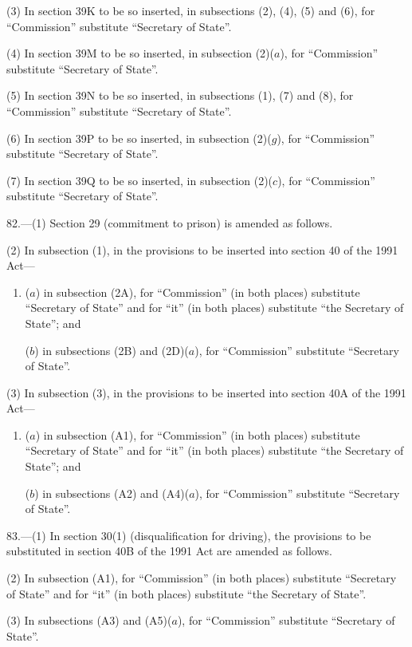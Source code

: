 \documentclass[12pt,a4paper]{article}
\begin{document}
(3) In section 39K to be so inserted, in subsections (2), (4), (5) and (6), for “Commission” substitute “Secretary of State”.

(4) In section 39M to be so inserted, in subsection (2)($a$), for “Commission” substitute “Secretary of State”.

(5) In section 39N to be so inserted, in subsections (1), (7) and (8), for “Commission” substitute “Secretary of State”.

(6) In section 39P to be so inserted, in subsection (2)($g$), for “Commission” substitute “Secretary of State”.

(7) In section 39Q to be so inserted, in subsection (2)($c$), for “Commission” substitute “Secretary of State”.

\medskip

82.---(1)  Section 29 (commitment to prison) is amended as follows.

(2) In subsection (1), in the provisions to be inserted into section 40 of the 1991 Act—
\begin{enumerate}\item[]
($a$) in subsection (2A), for “Commission” (in both places) substitute “Secretary of State” and for “it” (in both places) substitute “the Secretary of State”; and

($b$) in subsections (2B) and (2D)($a$), for “Commission” substitute “Secretary of State”.
\end{enumerate}

(3) In subsection (3), in the provisions to be inserted into section 40A of the 1991 Act—
\begin{enumerate}\item[]
($a$) in subsection (A1), for “Commission” (in both places) substitute “Secretary of State” and for “it” (in both places) substitute “the Secretary of State”; and

($b$) in subsections (A2) and (A4)($a$), for “Commission” substitute “Secretary of State”.
\end{enumerate}

\medskip

83.---(1)  In section 30(1) (disqualification for driving), the provisions to be substituted in section 40B of the 1991 Act are amended as follows.

(2) In subsection (A1), for “Commission” (in both places) substitute “Secretary of State” and for “it” (in both places) substitute “the Secretary of State”.

(3) In subsections (A3) and (A5)($a$), for “Commission” substitute “Secretary of State”.
\end{document}
